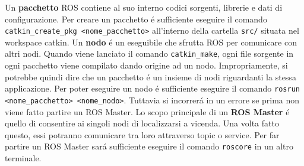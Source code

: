 Un \textbf{pacchetto} ROS contiene al suo interno codici sorgenti, librerie e dati di configurazione.
Per creare un pacchetto \'{e} sufficiente eseguire il comando \\
\verb|catkin_create_pkg <nome_pacchetto>| all'interno della cartella \verb|src/| situata nel workspace catkin.
Un \textbf{nodo} \'{e} un eseguibile che sfrutta ROS per comunicare con altri nodi.
Quando viene lanciato il comando \verb|catkin_make|, ogni file sorgente in ogni pacchetto viene compilato 
dando origine ad un nodo.
Impropriamente, si potrebbe quindi dire che un pacchetto \'{e} un insieme di nodi riguardanti la stessa applicazione.
Per poter eseguire un nodo \'{e} sufficiente eseguire il comando \verb|rosrun <nome_pacchetto> <nome_nodo>|.
Tuttavia si incorrer\'{a} in un errore se prima non viene fatto partire un ROS Master.
Lo scopo principale di un \textbf{ROS Master} \'{e} quello di consentire ai singoli nodi di localizzarsi a vicenda. Una volta 
fatto questo, essi potranno comunicare tra loro attraverso topic o service.
Per far partire un ROS Master sar\'{a} sufficiente eseguire il comando \verb|roscore| in un altro terminale.
